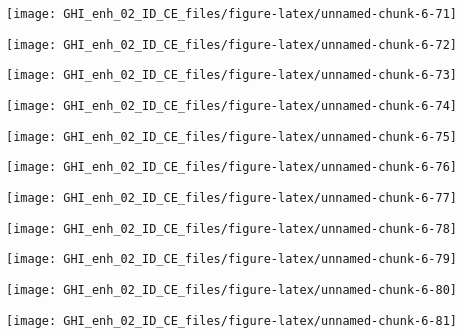 \documentclass[
  10pt,
  a4paper,oneside]{article}
\begin{document}
\begin{center}\texttt{[image: GHI\_enh\_02\_ID\_CE\_files/figure-latex/unnamed-chunk-6-71]} \end{center}

\begin{center}\texttt{[image: GHI\_enh\_02\_ID\_CE\_files/figure-latex/unnamed-chunk-6-72]} \end{center}

\begin{center}\texttt{[image: GHI\_enh\_02\_ID\_CE\_files/figure-latex/unnamed-chunk-6-73]} \end{center}

\begin{center}\texttt{[image: GHI\_enh\_02\_ID\_CE\_files/figure-latex/unnamed-chunk-6-74]} \end{center}

\begin{center}\texttt{[image: GHI\_enh\_02\_ID\_CE\_files/figure-latex/unnamed-chunk-6-75]} \end{center}

\begin{center}\texttt{[image: GHI\_enh\_02\_ID\_CE\_files/figure-latex/unnamed-chunk-6-76]} \end{center}

\begin{center}\texttt{[image: GHI\_enh\_02\_ID\_CE\_files/figure-latex/unnamed-chunk-6-77]} \end{center}

\begin{center}\texttt{[image: GHI\_enh\_02\_ID\_CE\_files/figure-latex/unnamed-chunk-6-78]} \end{center}

\begin{center}\texttt{[image: GHI\_enh\_02\_ID\_CE\_files/figure-latex/unnamed-chunk-6-79]} \end{center}

\begin{center}\texttt{[image: GHI\_enh\_02\_ID\_CE\_files/figure-latex/unnamed-chunk-6-80]} \end{center}

\begin{center}\texttt{[image: GHI\_enh\_02\_ID\_CE\_files/figure-latex/unnamed-chunk-6-81]} \end{center}
\end{document}
